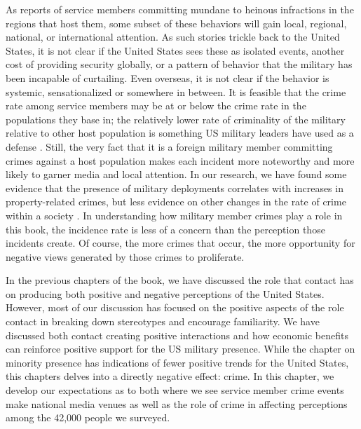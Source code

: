 As reports of service members committing mundane to heinous infractions in the regions that host them, some subset of these behaviors will gain local, regional, national, or international attention. As such stories trickle back to the United States, it is not clear if the United States sees these as isolated events, another cost of providing security globally, or a pattern of behavior that the military has been incapable of curtailing. Even overseas, it is not clear if the behavior is systemic, sensationalized or somewhere in between. It is feasible that the crime rate among service members may be at or below the crime rate in the populations they base in; the relatively lower rate of criminality of the military relative to other host population is something US military leaders have used as a defense \cite{Gillem2007}. Still, the very fact that it is a foreign military member committing crimes against a host population makes each incident more noteworthy and more likely to garner media and local attention. In our research, we have found some evidence that the presence of military deployments correlates with increases in property-related crimes, but less evidence on other changes in the rate of crime within a society \cite{Allen2011}. In understanding how military member crimes play a role in this book, the incidence rate is less of a concern than the perception those incidents create. Of course, the more crimes that occur, the more opportunity for negative views generated by those crimes to proliferate. %

In the previous chapters of the book, we have discussed the role that contact has on producing both positive and negative perceptions of the United States. However, most of our discussion has focused on the positive aspects of the role contact in breaking down stereotypes and encourage familiarity. We have discussed both contact creating positive interactions and how economic benefits can reinforce positive support for the US military presence. While the chapter on minority presence has indications of fewer positive trends for the United States, this chapters delves into a directly negative effect: crime. In this chapter, we develop our expectations as to both where we see service member crime events make national media venues as well as the role of crime in affecting perceptions among the 42,000 people we surveyed. 

